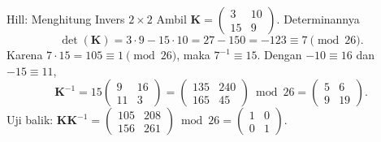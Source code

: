 \documentclass[aspectratio=169,11pt]{beamer}
\begin{document}
\begin{frame}{Hill: Menghitung Invers $2\times2$}
    \footnotesize
    Ambil
    $\mathbf{K}=\begin{pmatrix}3&10\\15&9\end{pmatrix}$.
    Determinannya
    \[
        \det(\mathbf{K})=3\cdot9-15\cdot10=27-150=-123\equiv7\pmod{26}.
    \]
    Karena $7\cdot15=105\equiv1\pmod{26}$, maka $7^{-1}\equiv15$.
    Dengan $-10\equiv16$ dan $-15\equiv11$,
    \[
        \mathbf{K}^{-1}=15
        \begin{pmatrix}9&16\\11&3\end{pmatrix}
        =
        \begin{pmatrix}135&240\\165&45\end{pmatrix}
        \bmod 26
        =
        \begin{pmatrix}5&6\\9&19\end{pmatrix}.
    \]
    Uji balik:
    $\mathbf{KK}^{-1}=
    \begin{pmatrix}105&208\\156&261\end{pmatrix}\bmod26
    =\begin{pmatrix}1&0\\0&1\end{pmatrix}$.
\end{frame}
\end{document}
